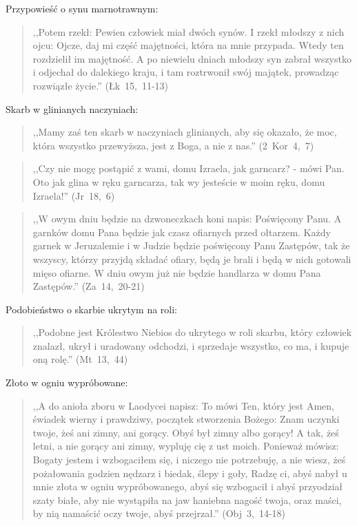 \documentclass[10pt,a4paper,oneside]{article}
\begin{document}
Przypowieść o synu marnotrawnym:
\begin{quote}
,,Potem rzekł: Pewien człowiek miał dwóch synów. I rzekł młodszy z nich ojcu: Ojcze, daj mi część majętności, która na mnie przypada. Wtedy ten rozdzielił im majętność. A po niewielu dniach młodszy syn zabrał wszystko i odjechał do dalekiego kraju, i tam roztrwonił swój majątek, prowadząc rozwiązłe życie.'' \mbox{(Łk 15, 11-13)}
\end{quote}

Skarb w glinianych naczyniach:
\begin{quote}
,,Mamy zaś ten skarb w naczyniach glinianych, aby się okazało, że moc, która wszystko przewyższa, jest z Boga, a nie z nas.'' \mbox{(2 Kor 4, 7)}
\end{quote}
\begin{quote}
,,Czy nie mogę postąpić z wami, domu Izraela, jak garncarz? - mówi Pan. Oto jak glina w ręku garncarza, tak wy jesteście w moim ręku, domu Izraela!'' \mbox{(Jr 18, 6)}
\end{quote}
\begin{quote}
,,W owym dniu będzie na dzwoneczkach koni napis: Poświęcony Panu. A garnków domu Pana będzie jak czasz ofiarnych przed ołtarzem. Każdy garnek w Jeruzalemie i w Judzie będzie poświęcony Panu Zastępów, tak że wszyscy, którzy przyjdą składać ofiary, będą je brali i będą w nich gotowali mięso ofiarne. W dniu owym już nie będzie handlarza w domu Pana Zastępów.'' \mbox{(Za 14, 20-21)}
\end{quote}

Podobieństwo o skarbie ukrytym na roli:
\begin{quote}
,,Podobne jest Królestwo Niebios do ukrytego w roli skarbu, który człowiek znalazł, ukrył i uradowany odchodzi, i sprzedaje wszystko, co ma, i kupuje oną rolę.'' \mbox{(Mt 13, 44)}
\end{quote}

Złoto w ogniu wypróbowane:
\begin{quote}
,,A do anioła zboru w Laodycei napisz: To mówi Ten, który jest Amen, świadek wierny i prawdziwy, początek stworzenia Bożego: Znam uczynki twoje, żeś ani zimny, ani gorący. Obyś był zimny albo gorący! A tak, żeś letni, a nie gorący ani zimny, wypluję cię z ust moich. Ponieważ mówisz: Bogaty jestem i wzbogaciłem się, i niczego nie potrzebuję, a nie wiesz, żeś pożałowania godzien nędzarz i biedak, ślepy i goły, Radzę ci, abyś nabył u mnie złota w ogniu wypróbowanego, abyś się wzbogacił i abyś przyodział szaty białe, aby nie wystąpiła na jaw haniebna nagość twoja, oraz maści, by nią namaścić oczy twoje, abyś przejrzał.'' \mbox{(Obj 3, 14-18)}
\end{quote}
\end{document}

